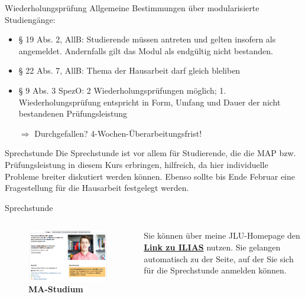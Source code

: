 \documentclass[11pt]{beamer}
\begin{document}
\begin{frame}[t]{Wiederholungsprüfung}
Allgemeine Bestimmungen über modularisierte Studiengänge: \\
	\begin{itemize}
		\item § 19 Abs. 2, AllB: Studierende müssen  antreten und gelten insofern als angemeldet. Andernfalls gilt das Modul als endgültig nicht bestanden.
		\item § 22 Abs. 7, AllB: Thema der Hausarbeit darf gleich bleliben
		\item § 9 Abs. 3 SpezO: 2 Wiederholungsprüfungen möglich; 1. Wiederholungsprüfung entspricht in Form, Umfang und Dauer der nicht bestandenen Prüfungsleistung
		\item[$\Rightarrow$] Durchgefallen? 4-Wochen-Überarbeitungsfrist!
	\end{itemize}
\end{frame}

\begin{frame}[t]{Sprechstunde}
Die Sprechstunde ist vor allem für Studierende, die die MAP bzw. Prüfungsleistung in diesem Kurs erbringen, hilfreich, da hier individuelle Probleme breiter diskutiert werden können. Ebenso sollte bis Ende Februar eine Fragestellung für die Hausarbeit festgelegt werden. 

\end{frame}

\begin{frame}[t]{Sprechstunde}
	\begin{columns}
		\begin{column}{0.5\textwidth}
		\begin{figure}[ht]
		\includegraphics[width=\textwidth]{pics/pre6.png}
		\caption{\textbf{MA-Studium}}
	\end{figure}
		\end{column}
		\begin{column}{0.5\textwidth}
			Sie können über meine JLU-Homepage den \href{https://ilias.uni-giessen.de/ilias/goto.php?target=usr_172921&client_id=JLUG}{\textbf{Link zu ILIAS}} nutzen. Sie gelangen automatisch zu der Seite, auf der Sie sich für die Sprechstunde anmelden können.
		\end{column}
	\end{columns}
\end{frame}
\end{document}
